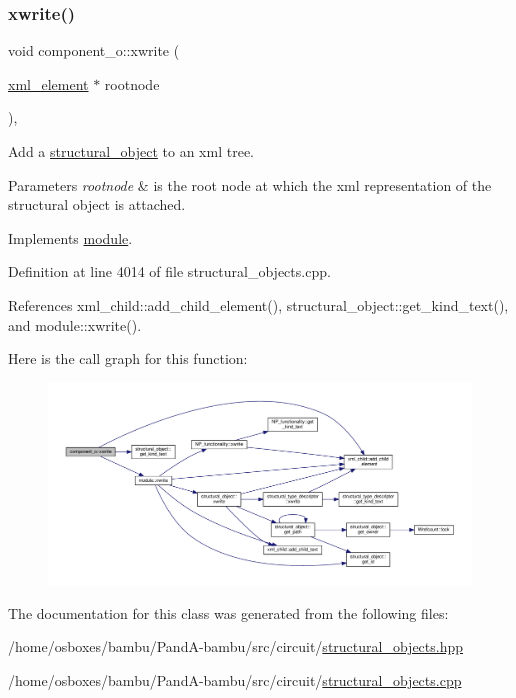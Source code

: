\subsubsection{\texorpdfstring{xwrite()}{xwrite()}}
{\footnotesize\ttfamily void component\+\_\+o\+::xwrite (\begin{DoxyParamCaption}\item[{\hyperlink{classxml__element}{xml\+\_\+element} $\ast$}]{rootnode }\end{DoxyParamCaption})\hspace{0.3cm}{\ttfamily [override]}, {\ttfamily [virtual]}}



Add a \hyperlink{classstructural__object}{structural\+\_\+object} to an xml tree. 


\begin{DoxyParams}{Parameters}
{\em rootnode} & is the root node at which the xml representation of the structural object is attached. \\
\hline
\end{DoxyParams}


Implements \hyperlink{classmodule_acd60f65d5beaeed8a6728ea1cb506b74}{module}.



Definition at line 4014 of file structural\+\_\+objects.\+cpp.



References xml\+\_\+child\+::add\+\_\+child\+\_\+element(), structural\+\_\+object\+::get\+\_\+kind\+\_\+text(), and module\+::xwrite().

Here is the call graph for this function\+:
\nopagebreak
\begin{figure}[H]
\begin{center}
\leavevmode
\includegraphics[width=350pt]{de/d6c/classcomponent__o_a96fc64957b68763fbfc946efdbc0249e_cgraph}
\end{center}
\end{figure}


The documentation for this class was generated from the following files\+:\begin{DoxyCompactItemize}
\item 
/home/osboxes/bambu/\+Pand\+A-\/bambu/src/circuit/\hyperlink{structural__objects_8hpp}{structural\+\_\+objects.\+hpp}\item 
/home/osboxes/bambu/\+Pand\+A-\/bambu/src/circuit/\hyperlink{structural__objects_8cpp}{structural\+\_\+objects.\+cpp}\end{DoxyCompactItemize}
